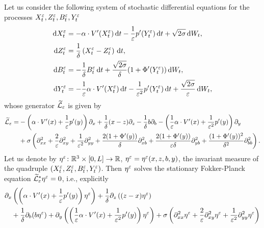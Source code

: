 \documentclass[10pt]{article}
\begin{document}
\begin{appendices}
	Let us consider the following system of stochastic differential equations for the processes $X_t^\varepsilon, Z_t^\varepsilon, B_t^\varepsilon, Y_t^\varepsilon$
	\begin{equation}
	\label{eq:systemSDEquadruple}
	\begin{aligned}
	\mathrm{d} X_t^\varepsilon &= -\alpha \cdot V'(X_t^\varepsilon) \,\mathrm{d} t - \frac1{\varepsilon} p'(Y_t^\varepsilon) \,\mathrm{d} t+ \sqrt{2\sigma} \,\mathrm{d} W_t, \\
	\mathrm{d} Z_t^\varepsilon &= \frac1\delta \left ( X^\varepsilon_t - Z^\varepsilon_t \right ) \,\mathrm{d} t, \\
	\mathrm{d} B_t^\varepsilon &= - \frac1\delta B_t^\varepsilon \,\mathrm{d} t + \frac{\sqrt{2\sigma}}{\delta}(1+\Phi'(Y_t^\varepsilon)) \,\mathrm{d} W_t, \\
	\mathrm{d} Y_t^\varepsilon &= -\frac1{\varepsilon} \alpha \cdot V'(X_t^\varepsilon) \,\mathrm{d} t - \frac{1}{\varepsilon^2} p'(Y_t^\varepsilon) \,\mathrm{d} t+ \frac{\sqrt{2\sigma}}{\varepsilon} \,\mathrm{d} W_t,
	\end{aligned}
	\end{equation}
	whose generator $\widetilde{\mathcal L}_\varepsilon$ is given by
	\begin{equation}
	\begin{aligned}
	\widetilde{\mathcal L}_\varepsilon =& -\left( \alpha \cdot V'(x) + \frac1{\varepsilon} p'(y) \right) \partial_x + \frac1\delta (x-z) \partial_z - \frac1\delta b \partial_b - \left( \frac1{\varepsilon} \alpha \cdot V'(x) + \frac{1}{\varepsilon^2} p'(y) \right) \partial_y \\
	& + \sigma \left( \partial_{xx}^2 + \frac2{\varepsilon} \partial_{xy}^2 + \frac{1}{\varepsilon^2} \partial_{yy}^2 + \frac{2(1+\Phi'(y))}{\delta} \partial_{xb}^2 + \frac{2(1+\Phi'(y))}{\varepsilon \delta} \partial_{yb}^2 + \frac{(1+\Phi'(y))^2}{\delta^2} \partial_{bb}^2 \right).
	\end{aligned}
	\end{equation}
	Let us denote by $\eta^\varepsilon \colon \mathbb{R}^3 \times [0,L] \to \mathbb{R}$, $\eta^\varepsilon = \eta^\varepsilon(x,z,b,y)$, the invariant measure of the quadruple $(X_t^\varepsilon, Z_t^\varepsilon, B_t^\varepsilon, Y_t^\varepsilon)$. Then $\eta^\varepsilon$ solves the stationary Fokker-Planck equation $\widetilde{\mathcal L}_\varepsilon^* \eta^\varepsilon = 0$, i.e., explicitly
	\begin{equation} \label{eq:FPSDEquadruple}
	\begin{aligned}
	&\partial_x \left( \left( \alpha \cdot V'(x) + \frac1\epl p'(y) \right) \eta^\epl \right) + \frac1\delta\partial_z \left( (z-x) \eta^\epl \right) \\
	&\quad + \frac1\delta \partial_b (b\eta^\epl)  + \partial_y \left( \left( \frac1\epl \alpha \cdot V'(x) + \frac{1}{\epl^2} p'(y) \right) \eta^\epl \right) + \sigma \left( \partial_{xx}^2 \eta^\epl + \frac2\epl \partial_{xy}^2 \eta^\epl + \frac1{\epl^2} \partial_{yy}^2 \eta^\epl \right) \\

\end{aligned}
\end{equation}
\end{appendices}
\end{document}
